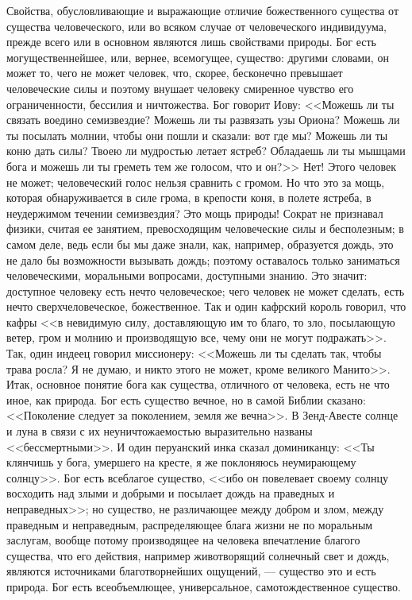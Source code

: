 \documentclass[12pt,oneside]{book}
\begin{document}
Свойства, обусловливающие и выражающие отличие божественного существа от существа человеческого, или во всяком случае от человеческого индивидуума, прежде всего или в основном являются лишь свойствами природы. Бог есть могущественнейшее, или, вернее, всемогущее, существо: другими словами, он может то, чего не может человек, что, скорее, бесконечно превышает человеческие силы и поэтому внушает человеку смиренное чувство его ограниченности, бессилия и ничтожества. Бог говорит Иову: <<Можешь ли ты связать воедино семизвездие? Можешь ли ты развязать узы Ориона? Можешь ли ты посылать молнии, чтобы они пошли и сказали: вот где мы? Можешь ли ты коню дать силы? Твоею ли мудростью летает ястреб? Обладаешь ли ты мышцами бога и можешь ли ты греметь тем же голосом, что и он?>> Нет! Этого человек не может; человеческий голос нельзя сравнить с громом. Но что это за мощь, которая обнаруживается в силе грома, в крепости коня, в полете ястреба, в неудержимом течении семизвездия? Это мощь природы! Сократ не признавал физики, считая ее занятием, превосходящим человеческие силы и бесполезным; в самом деле, ведь если бы мы даже знали, как, например, образуется дождь, это не дало бы возможности вызывать дождь; поэтому оставалось только заниматься человеческими, моральными вопросами, доступными знанию. Это значит: доступное человеку есть нечто человеческое; чего человек не может сделать, есть нечто сверхчеловеческое, божественное. Так и один кафрский король говорил, что кафры << в невидимую силу, доставляющую им то благо, то зло, посылающую ветер, гром и молнию и производящую все, чему они не могут подражать>>. Так, один индеец говорил миссионеру: <<Можешь ли ты сделать так, чтобы трава росла? Я не думаю, и никто этого не может, кроме великого Манито>>. Итак, основное понятие бога как существа, отличного от человека, есть не что иное, как природа. Бог есть существо вечное, но в самой Библии сказано: <<Поколение следует за поколением, земля же вечна>>. В Зенд-Авесте солнце и луна в связи с их неуничтожаемостью выразительно названы <<бессмертными>>. И один перуанский инка сказал доминиканцу: <<Ты клянчишь у бога, умершего на кресте, я же поклоняюсь неумирающему солнцу>>. Бог есть всеблагое существо, <<ибо он повелевает своему солнцу восходить над злыми и добрыми и посылает дождь на праведных и неправедных>>; но существо, не различающее между добром и злом, между праведным и неправедным, распределяющее блага жизни не по моральным заслугам, вообще потому производящее на человека впечатление благого существа, что его действия, например животворящий солнечный свет и дождь, являются источниками благотворнейших ощущений, --- существо это и есть природа. Бог есть всеобъемлющее, универсальное, самотождественное существо.
\end{document}

